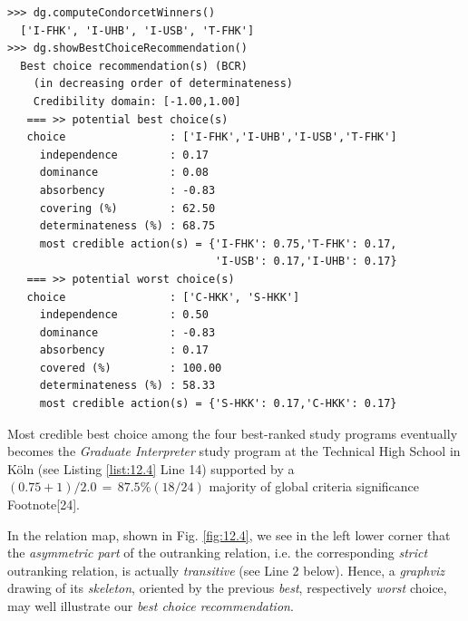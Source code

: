 \begin{lstlisting}[caption={Alice's best choice recommendation},label=list:12.4]
>>> dg.computeCondorcetWinners()
  ['I-FHK', 'I-UHB', 'I-USB', 'T-FHK'] 
>>> dg.showBestChoiceRecommendation()
  Best choice recommendation(s) (BCR)
    (in decreasing order of determinateness)   
    Credibility domain: [-1.00,1.00]
   === >> potential best choice(s)
   choice                : ['I-FHK','I-UHB','I-USB','T-FHK']
     independence        : 0.17
     dominance           : 0.08
     absorbency          : -0.83
     covering (%)        : 62.50
     determinateness (%) : 68.75
     most credible action(s) = {'I-FHK': 0.75,'T-FHK': 0.17,
                                'I-USB': 0.17,'I-UHB': 0.17}
   === >> potential worst choice(s) 
   choice                : ['C-HKK', 'S-HKK']
     independence        : 0.50
     dominance           : -0.83
     absorbency          : 0.17
     covered (%)         : 100.00
     determinateness (%) : 58.33
     most credible action(s) = {'S-HKK': 0.17,'C-HKK': 0.17}
\end{lstlisting}
   
Most credible best choice among the four best-ranked study programs eventually becomes the \emph{Graduate Interpreter} study program at the Technical High School in Köln (see Listing \ref{list:12.4} Line 14) supported by a $(0.75 + 1)/2.0 \,=\,87.5\% (18/24)$ majority of global criteria significance Footnote[24].

In the relation map, shown in Fig. \ref{fig:12.4}, we see in the left lower corner that the \emph{asymmetric part} of the outranking relation, i.e. the corresponding \emph{strict} outranking relation, is actually \emph{transitive} (see Line 2 below). Hence, a \emph{graphviz} drawing of its \emph{skeleton}, oriented by the previous \emph{best}, respectively \emph{worst} choice, may well illustrate our \emph{best choice recommendation}.

